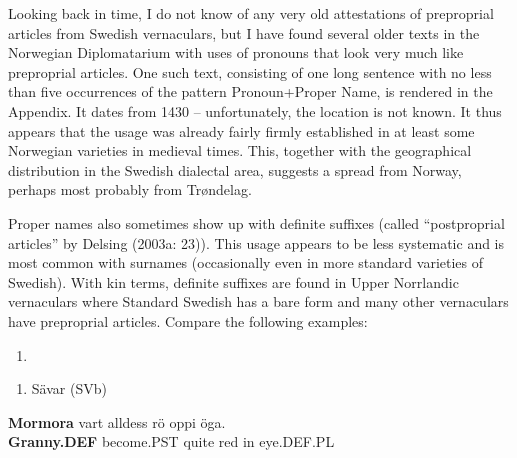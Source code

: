 Looking back in time, I do not know of any very old attestations of preproprial articles from Swedish vernaculars, but I have found several older texts in the Norwegian Diplomatarium with uses of pronouns that look very much like preproprial articles. One such text, consisting of one long sentence with no less than five occurrences of the pattern Pronoun+Proper Name, is rendered in the Appendix. It dates from 1430 – unfortunately, the location is not known. It thus appears that the usage was already fairly firmly established in at least some Norwegian varieties in medieval times. This, together with the geographical distribution in the Swedish dialectal area, suggests a spread from Norway, perhaps most probably from Trøndelag.

Proper names also sometimes show up with definite suffixes (called “postproprial articles” by Delsing (2003a: 23)). This usage appears to be less systematic and is most common with surnames (occasionally even in more standard varieties of Swedish). With kin terms, definite suffixes are found in Upper Norrlandic vernaculars where Standard Swedish has a bare form and many other vernaculars have preproprial articles. Compare the following examples:

\begin{enumerate} %
\item 
\end{enumerate} %
\setcounter{listLFOxcviiileveli}{0}
\begin{enumerate} %
\item 
Sävar (SVb)

\end{enumerate} %
\ea\label{}
\gll \textbf{Mormora} vart  alldess  rö  oppi  öga.\\


\textbf{Granny.DEF} become.PST  quite  red  in  eye.DEF.PL\\ %


